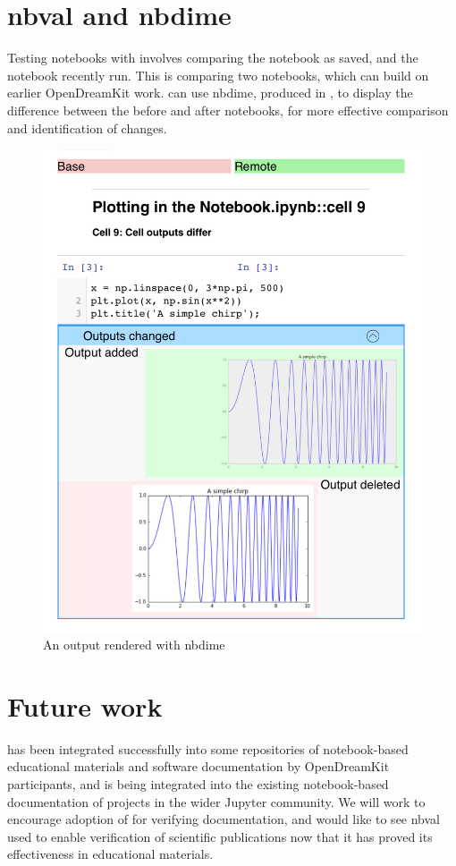 \documentclass{deliverablereport}
\begin{document}
\section{nbval and nbdime} %

Testing notebooks with \nbval involves comparing the notebook as saved,
and the notebook recently run.
This is comparing two notebooks,
which can build on earlier OpenDreamKit work.
\nbval can use nbdime, produced in ,
to display the difference between the before and after notebooks,
for more effective comparison and identification of changes.

\begin{figure}[ht]
  \centering
  \includegraphics[width=.7\textwidth]{img/nbval-nbdime}
  \caption{An \nbval output rendered with nbdime}\label{fig:nbval-nbdime}
\end{figure}

\section{Future work} %

\nbval has been integrated successfully into some repositories of notebook-based educational materials and software documentation by OpenDreamKit participants,
and is being integrated into the existing notebook-based documentation of projects in the wider Jupyter community.
We will work to encourage adoption of \nbval for verifying documentation,
and would like to see nbval used to enable verification of scientific publications
now that it has proved its effectiveness in educational materials.

\printbibliography
\end{document}

